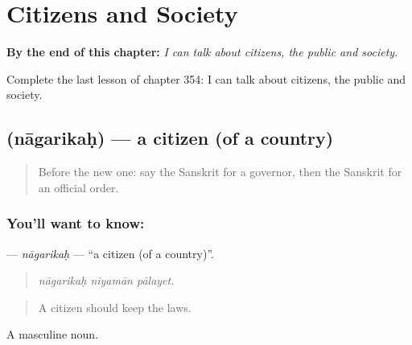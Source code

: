 
\chapter{Citizens and Society}
\label{ch:sa-citizens-and-society}

\begin{chapteropening}
\textbf{By the end of this chapter:} \emph{I can talk about citizens, the public and society.}

Complete the last lesson of chapter 354: I can talk about citizens, the public and society.
\end{chapteropening}

\section[\texorpdfstring{\sk{नागरिकः} (nāgarikaḥ)}{नागरिकः (nāgarikaḥ)}]{ (nāgarikaḥ) — a citizen (of a country)}

\label{lesson:SA-C354-nagarikah}



\begin{quote}
Before the new one: say the Sanskrit for a governor, then the Sanskrit for an official order.
\end{quote}

\subsection*{You'll want to know: }
\textbf{} — \emph{nāgarikaḥ} — \textquotedblleft{}a citizen (of a country)\textquotedblright{}.

\begin{quote}
  
\end{quote}

\begin{quote}
\emph{nāgarikaḥ niyamān pālayet.}
\end{quote}

\begin{quote}
A citizen should keep the laws.
\end{quote}

A masculine noun.

